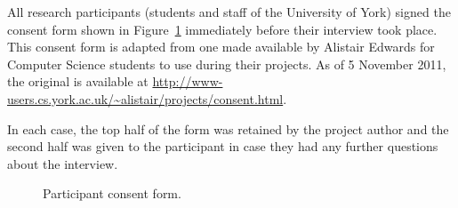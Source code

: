 \documentclass[draft]{scrartcl}
\begin{document}
All research participants (students and staff of the University of York)
signed the consent form shown in Figure~\ref{participantconsent} immediately
before their interview took place. This consent form is adapted from one made
available by Alistair Edwards for Computer Science students to use during
their projects. As of 5 November 2011, the original is available at
\url{http://www-users.cs.york.ac.uk/~alistair/projects/consent.html}.

In each case, the top half of the form was retained by the project author and
the second half was given to the participant in case they had any further
questions about the interview.

\begin{figure}[h]
  \begin{center}
  \end{center}
  \caption{Participant consent form.}
  \label{participantconsent}
\end{figure}
\end{document}
